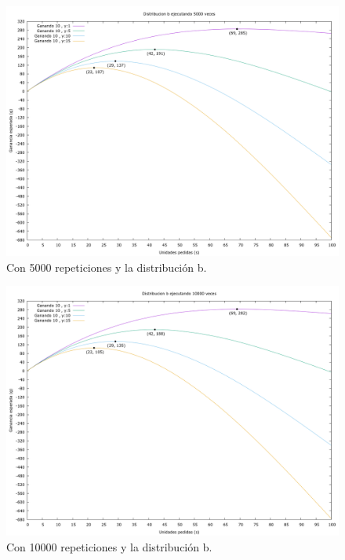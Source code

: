 \documentclass[12pt, spanish]{article}
\begin{document}
\begin{figure}[H]
	\centering
	\includegraphics[scale = 0.2]{prob_b/datos_b_5000.png}
	\caption{Con 5000 repeticiones y la distribución b.}
	\label{fig:ej1_a_5000}

\end{figure}


\begin{figure}[H]
	\centering
	\includegraphics[scale = 0.2]{prob_b/datos_b_10000.png}
	\caption{Con 10000 repeticiones y la distribución b.}
	\label{fig:ej1_a_10000}

\end{figure}
\end{document}
